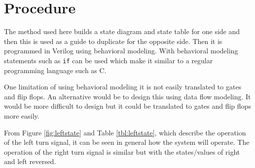 \documentclass[12pt]{article}
\begin{document}

\section{Procedure}
\label{sec:procedure}

The method used here builds a state diagram and state table
for one side and then this is used as a guide to duplicate
for the opposite side.
Then it is programmed in Verilog using behavioral modeling.
With behavioral modeling statements such as \verb+if+ can be
used which make it similar to a regular programming language such
as C.

One limitation of using behavioral modeling it is not easily
translated to gates and flip flops.
An alternative would be to design this using data flow modeling.
It would be more difficult to design but it could be translated
to gates and flip flops more easily.

From Figure \ref{fig:leftstate} and Table \ref{tbl:leftstate},
which describe the operation of the left turn signal,
it can be seen in general how the system will operate.
The operation of the right turn signal is similar but with
the states/values of right and left reversed.
\end{document}
